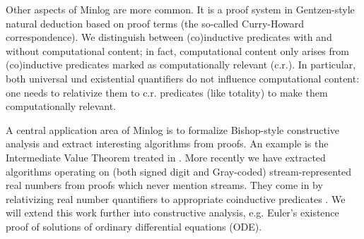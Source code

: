 Other aspects of Minlog are more common.  It is a proof system in
Gentzen-style natural deduction based on proof terms
(the so-called Curry-Howard correspondence).  We distinguish between
(co)inductive predicates with and without computational content; in
fact, computational content only arises from (co)inductive predicates
marked as computationally relevant (c.r.).  In particular, both
universal und existential quantifiers do not influence computational
content: one needs to relativize them to c.r. predicates (like
totality) to make them computationally relevant.

A central application area of Minlog is to formalize Bishop-style
\cite{Bishop67} constructive analysis and extract interesting algorithms
from proofs. An example is the Intermediate Value Theorem treated in
\cite{LindstroemPalmgrenSegerbergStoltenberg08}.  More recently we have
extracted algorithms operating on (both signed digit and Gray-coded)
stream-represented real numbers from proofs which never mention
streams.  They come in by relativizing real number quantifiers to
appropriate coinductive predicates \cite{Berger09}.
We will extend this
work further into constructive analysis, e.g. Euler's existence
proof of solutions of ordinary differential equations (ODE).

